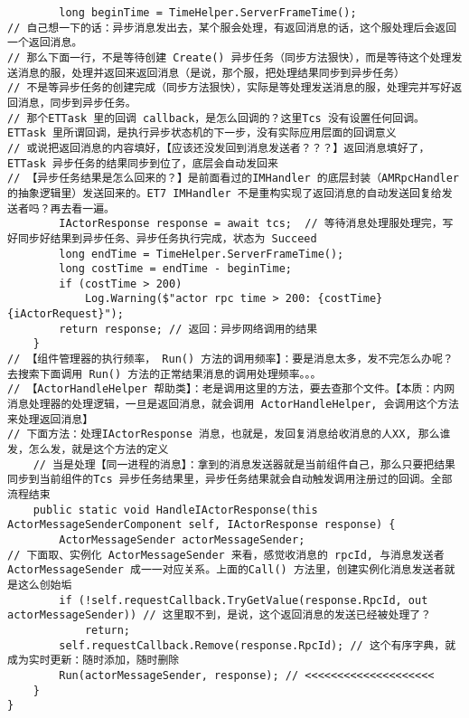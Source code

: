 \documentclass[9pt, b5paper]{article}
\begin{document}
\begin{verbatim}
        long beginTime = TimeHelper.ServerFrameTime();
// 自己想一下的话：异步消息发出去，某个服会处理，有返回消息的话，这个服处理后会返回一个返回消息。
// 那么下面一行，不是等待创建 Create() 异步任务（同步方法狠快），而是等待这个处理发送消息的服，处理并返回来返回消息（是说，那个服，把处理结果同步到异步任务）
// 不是等异步任务的创建完成（同步方法狠快），实际是等处理发送消息的服，处理完并写好返回消息，同步到异步任务。
// 那个ETTask 里的回调 callback，是怎么回调的？这里Tcs 没有设置任何回调。ETTask 里所谓回调，是执行异步状态机的下一步，没有实际应用层面的回调意义
// 或说把返回消息的内容填好，【应该还没发回到消息发送者？？？】返回消息填好了，ETTask 异步任务的结果同步到位了，底层会自动发回来
// 【异步任务结果是怎么回来的？】是前面看过的IMHandler 的底层封装（AMRpcHandler 的抽象逻辑里）发送回来的。ET7 IMHandler 不是重构实现了返回消息的自动发送回复给发送者吗？再去看一遍。
        IActorResponse response = await tcs;  // 等待消息处理服处理完，写好同步好结果到异步任务、异步任务执行完成，状态为 Succeed
        long endTime = TimeHelper.ServerFrameTime();
        long costTime = endTime - beginTime;
        if (costTime > 200) 
            Log.Warning($"actor rpc time > 200: {costTime} {iActorRequest}");
        return response; // 返回：异步网络调用的结果
    }
// 【组件管理器的执行频率， Run() 方法的调用频率】：要是消息太多，发不完怎么办呢？去搜索下面调用 Run() 方法的正常结果消息的调用处理频率。。。
// 【ActorHandleHelper 帮助类】：老是调用这里的方法，要去查那个文件。【本质：内网消息处理器的处理逻辑，一旦是返回消息，就会调用 ActorHandleHelper, 会调用这个方法来处理返回消息】        
// 下面方法：处理IActorResponse 消息，也就是，发回复消息给收消息的人XX, 那么谁发，怎么发，就是这个方法的定义
    // 当是处理【同一进程的消息】：拿到的消息发送器就是当前组件自己，那么只要把结果同步到当前组件的Tcs 异步任务结果里，异步任务结果就会自动触发调用注册过的回调。全部流程结束
    public static void HandleIActorResponse(this ActorMessageSenderComponent self, IActorResponse response) {
        ActorMessageSender actorMessageSender;
// 下面取、实例化 ActorMessageSender 来看，感觉收消息的 rpcId, 与消息发送者 ActorMessageSender 成一一对应关系。上面的Call() 方法里，创建实例化消息发送者就是这么创始垢 
        if (!self.requestCallback.TryGetValue(response.RpcId, out actorMessageSender)) // 这里取不到，是说，这个返回消息的发送已经被处理了？
            return;
        self.requestCallback.Remove(response.RpcId); // 这个有序字典，就成为实时更新：随时添加，随时删除
        Run(actorMessageSender, response); // <<<<<<<<<<<<<<<<<<<< 
    }
}
\end{verbatim}
\end{document}
